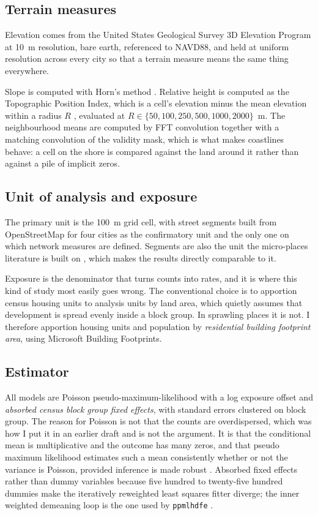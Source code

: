 \documentclass[10pt,letterpaper]{article}
\begin{document}
\subsection*{Terrain measures}

Elevation comes from the United States Geological Survey 3D Elevation Program at
10~m resolution, bare earth, referenced to NAVD88, and held at uniform resolution
across every city so that a terrain measure means the same thing everywhere.

Slope is computed with Horn's method \cite{horn1981}. Relative height is computed as the Topographic
Position Index, which is a cell's elevation minus the mean elevation within a radius
$R$ \cite{weiss2001}, evaluated at $R \in \{50, 100, 250, 500, 1000, 2000\}$~m. The
neighbourhood means are computed by FFT convolution together with a matching
convolution of the validity mask, which is what makes coastlines behave: a cell on
the shore is compared against the land around it rather than against a pile of
implicit zeros.

\subsection*{Unit of analysis and exposure}

The primary unit is the 100~m grid cell, with street segments built from OpenStreetMap
for four cities as the confirmatory unit and the only one on which network measures
are defined. Segments are also the unit the micro-places literature is built on
\cite{weisburd2015}, which makes the results directly comparable to it.

Exposure is the denominator that turns counts into rates, and it is where this kind
of study most easily goes wrong. The conventional choice is to apportion census
housing units to analysis units by land area, which quietly assumes that development
is spread evenly inside a block group. In sprawling places it is not. I therefore
apportion housing units and population by \emph{residential building footprint area},
using Microsoft Building Footprints.

\subsection*{Estimator}

All models are Poisson pseudo-maximum-likelihood with a log exposure offset and
\emph{absorbed census block group fixed effects}, with standard errors clustered on
block group. The reason for Poisson is not that the counts are overdispersed, which
was how I put it in an earlier draft and is not the argument. It is that the
conditional mean is multiplicative and the outcome has many zeros, and that pseudo
maximum likelihood estimates such a mean consistently whether or not the variance is
Poisson, provided inference is made robust \cite{silva2006}. Absorbed fixed effects
rather than dummy variables because five hundred to twenty-five hundred dummies make
the iteratively reweighted least squares fitter diverge; the inner weighted
demeaning loop is the one used by \texttt{ppmlhdfe} \cite{correia2020}.
\end{document}
